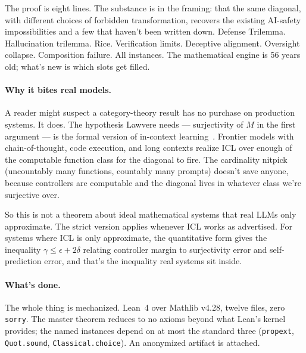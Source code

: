 The proof is eight lines. The substance is in the framing: that the same diagonal, with different choices of forbidden transformation, recovers the existing AI-safety impossibilities and a few that haven't been written down. Defense Trilemma. Hallucination trilemma. Rice. Verification limits. Deceptive alignment. Oversight collapse. Composition failure. All instances. The mathematical engine is 56 years old; what's new is which slots get filled.

\paragraph{Why it bites real models.}
A reader might suspect a category-theory result has no purchase on production systems. It does. The hypothesis Lawvere needs --- surjectivity of $M$ in the first argument --- is the formal version of in-context learning~\citep{brown2020gpt3, wei2022chain}. Frontier models with chain-of-thought, code execution, and long contexts realize ICL over enough of the computable function class for the diagonal to fire. The cardinality nitpick (uncountably many functions, countably many prompts) doesn't save anyone, because controllers are computable and the diagonal lives in whatever class we're surjective over.

So this is not a theorem about ideal mathematical systems that real LLMs only approximate. The strict version applies whenever ICL works as advertised. For systems where ICL is only approximate, the quantitative form gives the inequality $\gamma \le \epsilon + 2\delta$ relating controller margin to surjectivity error and self-prediction error, and that's the inequality real systems sit inside.

\paragraph{What's done.}
The whole thing is mechanized. Lean~4 over Mathlib v4.28, twelve files, zero \texttt{sorry}. The master theorem reduces to no axioms beyond what Lean's kernel provides; the named instances depend on at most the standard three (\texttt{propext}, \texttt{Quot.sound}, \texttt{Classical.choice}). An anonymized artifact is attached.

